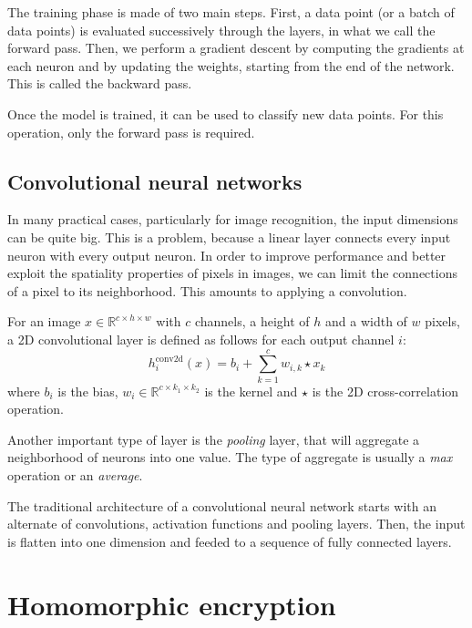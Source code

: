 \documentclass[a4paper,11pt,oneside]{report}
\begin{document}
The training phase is made of two main steps. First, a data point (or a batch of data points) is evaluated successively through the layers, in what we call the forward pass. Then, we perform a gradient descent by computing the gradients at each neuron and by updating the weights, starting from the end of the network. This is called the backward pass.

Once the model is trained, it can be used to classify new data points. For this operation, only the forward pass is required.

\subsection{Convolutional neural networks}

In many practical cases, particularly for image recognition, the input dimensions can be quite big. This is a problem, because a linear layer connects every input neuron with every output neuron. In order to improve performance and better exploit the spatiality properties of pixels in images, we can limit the connections of a pixel to its neighborhood. This amounts to applying a convolution.

For an image $x \in \mathbb{R}^{c \times h \times w}$ with $c$ channels, a height of $h$ and a width of $w$ pixels, a 2D convolutional layer is defined as follows for each output channel $i$:
\begin{equation}\label{eq:conv2d_layer}
    h_i^{\mathrm{conv2d}}(x) = b_i + \sum_{k=1}^{c} w_{i, k} \star x_{k}
\end{equation}
where $b_i$ is the bias, $w_i \in \mathbb{R}^{c \times k_1 \times k_2}$ is the kernel and $\star$ is the 2D cross-correlation operation.

Another important type of layer is the \emph{pooling} layer, that will aggregate a neighborhood of neurons into one value. The type of aggregate is usually a \emph{max} operation or an \emph{average}.

The traditional architecture of a convolutional neural network starts with an alternate of convolutions, activation functions and pooling layers. Then, the input is flatten into one dimension and feeded to a sequence of fully connected layers.


\section{Homomorphic encryption}
\end{document}
